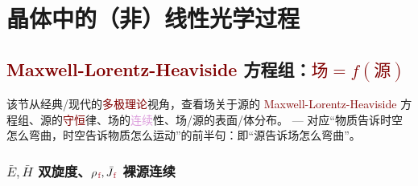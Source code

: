 
\chapter{晶体中的（非）线性光学过程}\label{chap:N/LCO}

\vspace*{-8.5em}

\section{\textcolor{Maroon}{Maxwell-Lorentz-Heaviside} 方程组：\textcolor{Maroon}{$\text{场} = f(\text{源})$}}\label{sec:maxwell}

该节从经典/现代的\textcolor{Maroon}{多极理论}视角，查看场关于源的 \textcolor{Maroon}{Maxwell-Lorentz-Heaviside} 方程组、源的\textcolor{Maroon}{守恒}律、场的\textcolor{Plum}{连续}性、场/源的表面/体分布。 --- 对应“物质告诉时空怎么弯曲，时空告诉物质怎么运动”的前半句：即“源告诉场怎么弯曲”。

\vspace*{-5.0em}

\subsection{$\bar{E},\bar{H}$ 双旋度、${\rho}_{\;\!\textcolor{Maroon}{\text{f}}}, \bar{J}_{\;\!\textcolor{Maroon}{\text{f}}}$ 裸源连续}\label{ssec:EHpJf}

